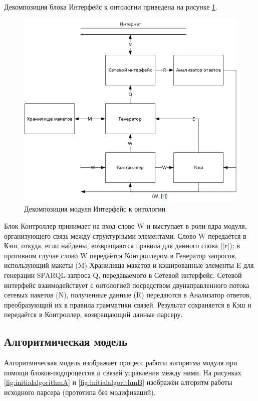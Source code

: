Декомпозиция блока Интерфейс к онтологии приведена на рисунке \ref{fig:decomposedstruct}.

\begin{figure}[H]
	\centering
		\includegraphics[scale=1.0]{images/decomposedstructure.png}
	\caption{\small Декомпозиция модуля Интерфейс к онтологии}
	\label{fig:decomposedstruct}
\end{figure}

Блок Контроллер принимает на вход слово W и выступает в роли ядра модуля, организующего связь между структурными элементами. Слово W передаётся в Кэш, откуда, если найдены, возвращаются правила для данного слова ([r]); в противном случае слово W передаётся Контроллером в Генератор запросов, использующий макеты (M) Хранилища макетов и кэшированные элементы E для генерации SPARQL-запроса Q, передаваемого в Сетевой интерфейс. Сетевой интерфейс взаимодействует с онтологией посредством двунаправленного потока сетевых пакетов (N), полученные данные (R) передаются в Анализатор ответов, преобразующий их в правила грамматики связей. Результат сохраняется в Кэш и передаётся в  Контроллер, возвращающий данные парсеру.

\subsection{Алгоритмическая модель}

Алгоритмическая модель изображает процесс работы алгоритма модуля при помощи блоков-подпроцессов и связей управления между ними. На рисунках \ref{fig:initialalgorithmA} и \ref{fig:initialalgorithmB} изображён алгоритм работы исходного парсера (прототипа без модификаций).

